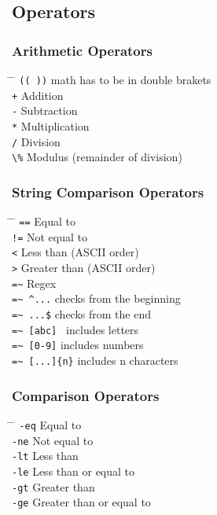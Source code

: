 \documentclass[a4paper,10pt]{article}
\begin{document}
\subsection{Operators}
\subsubsection*{Arithmetic Operators}
\begin{tabbing}
	\= \hspace{30mm} \= \hspace{50mm} \kill
	\> \verb|(( ))| \> math has to be in double brakets \\
	\> \verb|+| \> Addition \\
	\> \verb|-| \> Subtraction \\
	\> \verb|*| \> Multiplication \\
	\> \verb|/| \> Division \\
	\> \verb|\%| \> Modulus (remainder of division) \\
\end{tabbing}

\subsubsection*{String Comparison Operators}
\begin{tabbing}
	\= \hspace{30mm} \= \hspace{50mm} \kill
	\> \verb|==| \> Equal to \\
	\> \verb|!=| \> Not equal to \\
	\> \verb|<| \> Less than (ASCII order) \\
	\> \verb|>| \> Greater than (ASCII order) \\
	\> \verb|=~| \> Regex \\
	\> \verb|=~ ^...| \> checks from the beginning \\
	\> \verb|=~ ...$| \> checks from the end \\
	\> \verb|=~ [abc] | \> includes letters \\
	\> \verb|=~ [0-9]| \> includes numbers \\
	\> \verb|=~ [...]{n}| \> includes n characters \\
\end{tabbing}

\subsubsection*{Comparison Operators}
\begin{tabbing}
	\= \hspace{30mm} \= \hspace{50mm} \kill
	\> \verb|-eq| \> Equal to \\
	\> \verb|-ne| \> Not equal to \\
	\> \verb|-lt| \> Less than \\
	\> \verb|-le| \> Less than or equal to \\
	\> \verb|-gt| \> Greater than \\
	\> \verb|-ge| \> Greater than or equal to \\
\end{tabbing}
\end{document}
